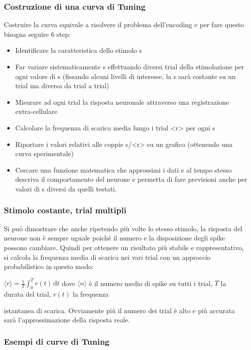 \documentclass[12pt,a4paper,openany]{book}
\begin{document}
\subsubsection{Costruzione di una curva di Tuning}

Costruire la curva equivale a risolvere il problema dell'encoding e per fare questo bisogna seguire 6 step:

\begin{itemize}
  \item Identificare la caratteristica dello stimolo s
  \item Far variare sistematicamente s effettuando diversi trial della stimolazione per ogni valore di s (fissando alcuni livelli di interesse, la s sarà costante su un trial ma diversa da trial a trial)
  \item Misurare ad ogni trial la risposta neuronale attraverso una registrazione extra-cellulare
  \item Calcolare la frequenza di scarica media lungo i trial <r> per ogni s
  \item Riportare i valori relativi alle coppie s/<r> su un grafico (ottenendo una curva sperimentale)
  \item Cercare una funzione matematica che approssimi i dati e al tempo stesso descriva il comportamento del neurone e permetta di fare previsioni anche per valori di s diversi da quelli testati.
\end{itemize}
\subsubsection{Stimolo costante, trial multipli}

Si può dimostrare che anche ripetendo più volte lo stesso stimolo, la risposta del neurone non è sempre uguale poiché il numero e la disposizione degli spike possono cambiare. Quindi per ottenere un risultato più stabile e rappresentativo, si calcola la frequenza media di scarica nei vari trial con un approccio probabilistico in questo modo:

$\langle r \rangle = \frac{1}{T}\int_0^T r(t)\,\mathrm{d}t$ dove $\langle n \rangle$ è il numero medio di spike su tutti i trial, $T$ la durata del trial, $r(t)$ la frequenza

istantanea di scarica. Ovviamente più il numero dei trial è alto e più accurata sarà l'approssimazione della risposta reale.

\subsubsection{Esempi di curve di Tuning}
\end{document}
